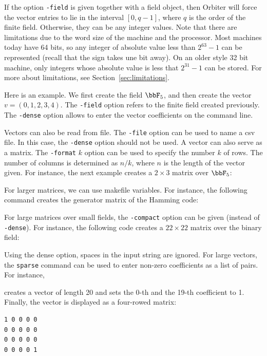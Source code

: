 \bigskip

If the option \verb'-field' is given together with a field object, then Orbiter will force the vector entries to lie in the 
interval $[0,q-1]$, where $q$ is the order of the finite field. 
Otherwise, they can be any integer values.
Note that there are limitations due to the word size of the machine and the processor. 
Most machines today have 64 bits, so any integer of absolute value less than  $2^{63} - 1$  
can be represented (recall that the sign takes une bit away).
On an older style 32 bit machine, only integers whose absolute value is less that $2^{31} - 1$ can be stored.
For more about limitations, see Section~\ref{sec:limitations}.

\bigskip


Here is an example. 
We first create the field $\bbF_5$, and then create the vector $v=(0,1,2,3,4)$.
The \verb'-field' option refers to the finite field created previously.
The \verb'-dense' option allows to enter the vector coefficients on the command line. 
{\tt

}
Vectors can also be read from file. 
The \verb'-file' option can be used to name a csv file. 
In this case, the \verb'-dense' option should not be used.
A vector can also serve as a matrix. 
The \verb'-format' $k$ option can be used to specify the number $k$ of rows. 
The number of columns is determined as $n/k$, where $n$ is the length of the vector given.
For instance, the next example creates a $2 \times 3$ matrix over $\bbF_5$:
{\tt

}
For larger matrices, we can use makefile variables.
For instance, the following command creates the generator matrix of the Hamming code:
{\tt

}
{\tt

}
For large matrices over small fields, the \verb'-compact' option can be given (instead of \verb'-dense'). 
For instance, the following code creates a $22 \times 22$ matrix over the binary field:
{\tt

}
{\tt

}
Using the dense option, spaces in the input string are ignored.
For large vectors, the \verb'sparse' command can be used to enter non-zero coefficients as a list of pairs. 
For instance,
{\tt

}
creates a vector of length 20 and sets the 0-th and the 19-th coefficient to 1. 
Finally, the vector is displayed as a four-rowed matrix:
\begin{verbatim}
1 0 0 0 0 
0 0 0 0 0 
0 0 0 0 0 
0 0 0 0 1 
\end{verbatim}


